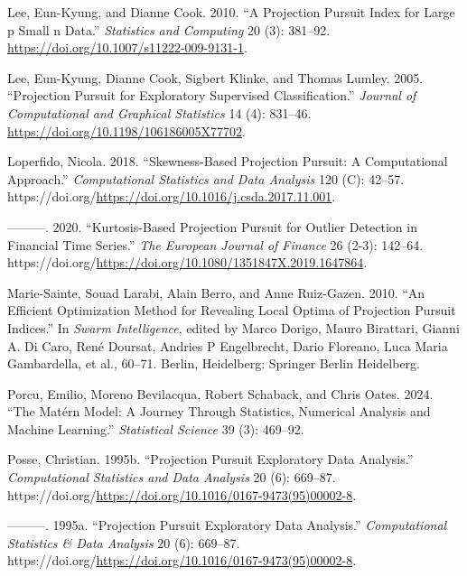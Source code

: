 \documentclass[
  12pt,
]{interact}
\newlength{\cslhangindent}
\newlength{\cslentryspacingunit} %
\newenvironment{CSLReferences}[2] %
 {%
  \setlength{\parindent}{0pt}
  \ifodd #1
  \let\oldpar\par
  \def\par{\hangindent=\cslhangindent\oldpar}
  \fi
  \setlength{\parskip}{#2\cslentryspacingunit}
 }%
 {}
\theoremstyle{plain}
\begin{document}
\begin{CSLReferences}{1}{0}
\leavevmode{}%
Lee, Eun-Kyung, and Dianne Cook. 2010. {``A Projection Pursuit Index for
Large p Small n Data.''} \emph{Statistics and Computing} 20 (3):
381--92. \url{https://doi.org/10.1007/s11222-009-9131-1}.

\leavevmode{}%
Lee, Eun-Kyung, Dianne Cook, Sigbert Klinke, and Thomas Lumley. 2005.
{``Projection Pursuit for Exploratory Supervised Classification.''}
\emph{Journal of Computational and Graphical Statistics} 14 (4):
831--46. \url{https://doi.org/10.1198/106186005X77702}.

\leavevmode{}%
Loperfido, Nicola. 2018. {``Skewness-Based Projection Pursuit: A
Computational Approach.''} \emph{Computational Statistics and Data
Analysis} 120 (C): 42--57.
https://doi.org/\url{https://doi.org/10.1016/j.csda.2017.11.001}.

\leavevmode{}%
---------. 2020. {``Kurtosis-Based Projection Pursuit for Outlier
Detection in Financial Time Series.''} \emph{The European Journal of
Finance} 26 (2-3): 142--64.
https://doi.org/\url{https://doi.org/10.1080/1351847X.2019.1647864}.

\leavevmode{}%
Marie-Sainte, Souad Larabi, Alain Berro, and Anne Ruiz-Gazen. 2010.
{``An Efficient Optimization Method for Revealing Local Optima of
Projection Pursuit Indices.''} In \emph{Swarm Intelligence}, edited by
Marco Dorigo, Mauro Birattari, Gianni A. Di Caro, René Doursat, Andries
P Engelbrecht, Dario Floreano, Luca Maria Gambardella, et al., 60--71.
Berlin, Heidelberg: Springer Berlin Heidelberg.

\leavevmode{}%
Porcu, Emilio, Moreno Bevilacqua, Robert Schaback, and Chris Oates.
2024. {``The {M}atérn Model: A Journey Through Statistics, Numerical
Analysis and Machine Learning.''} \emph{Statistical Science} 39 (3):
469--92.

\leavevmode{}%
Posse, Christian. 1995b. {``Projection Pursuit Exploratory Data
Analysis.''} \emph{Computational Statistics and Data Analysis} 20 (6):
669--87.
https://doi.org/\url{https://doi.org/10.1016/0167-9473(95)00002-8}.

\leavevmode{}%
---------. 1995a. {``Projection Pursuit Exploratory Data Analysis.''}
\emph{Computational Statistics \& Data Analysis} 20 (6): 669--87.
https://doi.org/\url{https://doi.org/10.1016/0167-9473(95)00002-8}.


\end{CSLReferences}
\end{document}
